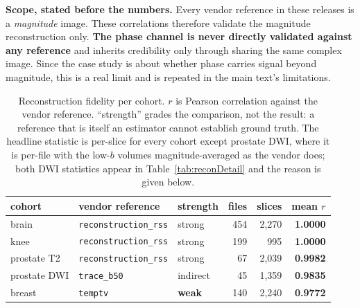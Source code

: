 \documentclass[11pt,a4paper]{article}
\begin{document}
\textbf{Scope, stated before the numbers.} Every vendor reference in these releases is
a \emph{magnitude} image. These correlations therefore validate the magnitude
reconstruction only. \textbf{The phase channel is never directly validated against any
reference} and inherits credibility only through sharing the same complex image. Since
the case study is about whether phase carries signal beyond magnitude, this is a real
limit and is repeated in the main text's limitations.

\begin{table}[htbp]
\centering
\caption{Reconstruction fidelity per cohort. $r$ is Pearson correlation against the
vendor reference. ``strength'' grades the comparison, not the result: a reference that
is itself an estimator cannot establish ground truth. The headline statistic is
per-slice for every cohort except prostate DWI, where it is per-file with the low-$b$
volumes magnitude-averaged as the vendor does; both DWI statistics appear in
Table~\ref{tab:reconDetail} and the reason is given below.}
\small
\begin{tabular}{@{}lllrrr@{}}
\toprule
cohort & vendor reference & strength & files & slices & mean $r$ \\
\midrule
brain        & \texttt{reconstruction\_rss} & strong   & 454 & 2{,}270 & \textbf{1.0000} \\
knee         & \texttt{reconstruction\_rss} & strong   & 199 &    995 & \textbf{1.0000} \\
prostate T2  & \texttt{reconstruction\_rss} & strong   &  67 & 2{,}039 & \textbf{0.9982} \\
prostate DWI & \texttt{trace\_b50}          & indirect &  45 & 1{,}359 & \textbf{0.9835} \\
breast       & \texttt{temptv}              & \textbf{weak} & 140 & 2{,}240 & \textbf{0.9772} \\
\bottomrule
\end{tabular}
\end{table}
\end{document}
